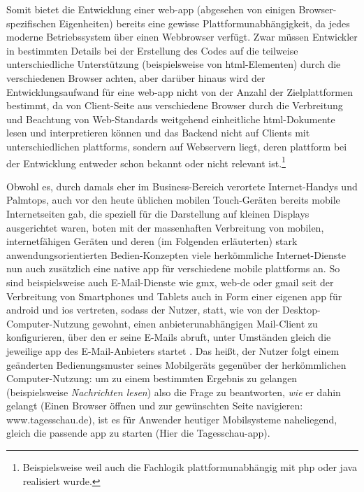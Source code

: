 Somit bietet die Entwicklung einer \gls{web-app} (abgesehen von einigen Browser-spezifischen Eigenheiten) bereits eine gewisse Plattformunabhängigkeit, da jedes moderne Betriebssystem über einen Webbrowser verfügt. 
Zwar müssen Entwickler in bestimmten Details bei der Erstellung des Codes auf die teilweise unterschiedliche Unterstützung (beispielsweise von \gls{html}-Elementen)  durch die verschiedenen Browser achten, aber darüber hinaus wird der Entwicklungsaufwand für eine \gls{web-app} nicht von der Anzahl der Zielplattformen bestimmt, da von Client-Seite aus verschiedene Browser durch die Verbreitung und Beachtung von Web-Standards weitgehend einheitliche \gls{html}-Dokumente lesen und interpretieren können und das Back\-end nicht auf Clients mit unterschiedlichen \glspl{plattform}, sondern auf Webservern liegt, deren \gls{plattform} bei der Entwicklung entweder schon bekannt oder nicht relevant ist.\footnote{Beispielsweise weil auch die Fachlogik plattformunabhängig mit \gls*{php} oder \gls*{java} realisiert wurde.}

Obwohl es, durch damals eher im Business-Bereich verortete Internet-Handys und Palmtops, auch vor den heute üblichen mobilen Touch-Geräten bereits mobile Internetseiten gab, die speziell für die Darstellung auf kleinen Displays ausgerichtet waren, boten mit der massenhaften Verbreitung von mobilen, internetfähigen Geräten und deren (im Folgenden erläuterten) stark anwendungsorientierten Bedien-Konzepten viele herkömmliche Internet-Dienste nun auch zusätzlich eine native \gls{app} für verschiedene mobile \glspl{plattform} an.
So sind beispielsweise auch E-Mail-Dienste wie \gls{gmx}, \gls{web-de} oder \gls{gmail} seit der Verbreitung von Smartphones und Tablets auch in Form einer eigenen \gls{app} für \gls{android} und \gls{ios} vertreten, sodass der Nutzer, statt, wie von der Desktop-Computer-Nutzung gewohnt, einen anbieterunabhängigen Mail-Client zu konfigurieren, über den er seine E-Mails abruft, unter Umständen gleich die jeweilige \gls{app} des E-Mail-Anbieters startet \cite{gmx, web.de, gmail}.
Das heißt, der Nutzer folgt einem geänderten Bedienungsmuster seines Mobilgeräts gegenüber der herkömmlichen Computer-Nutzung: um zu einem bestimmten Ergebnis zu gelangen (beispielsweise \emph{Nachrichten lesen}) also die Frage zu beantworten, \emph{wie} er dahin gelangt (Einen Browser öffnen und zur gewünschten Seite navigieren: www.tagesschau.de), ist es für Anwender heutiger Mobilsysteme naheliegend, gleich die passende \gls{app} zu starten (Hier \zB die Tagesschau-\gls{app}).


